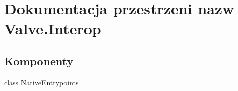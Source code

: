 \hypertarget{namespace_valve_1_1_interop}{}\section{Dokumentacja przestrzeni nazw Valve.\+Interop}
\label{namespace_valve_1_1_interop}
\subsection*{Komponenty}
\begin{DoxyCompactItemize}
\item 
class \hyperlink{class_valve_1_1_interop_1_1_native_entrypoints}{Native\+Entrypoints}
\end{DoxyCompactItemize}

